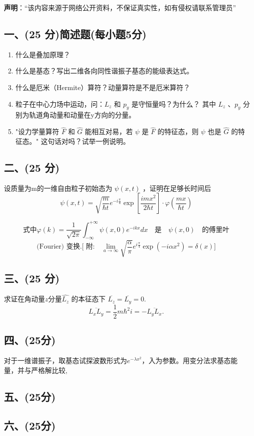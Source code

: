 
\textbf{声明}：“该内容来源于网络公开资料，不保证真实性，如有侵权请联系管理员”

\subsection{一、(25 分)简述题(每小题5分)}
\begin{enumerate}
        \item 什么是叠加原理？
        \item 什么是基态？写出二维各向同性谐振子基态的能级表达式。
        \item 什么是厄米（Hermite）算符？动量算符是不是厄米算符？
        \item 粒子在中心力场中运动，问：$L_z$ 和 $p_y$ 是守恒量吗？为什么？
        其中 $L_z$ 、$p_y$ 分别为轨道角动量和动量在y方向的分量。
        \item "设力学量算符 $\hat{F}$ 和 $\hat{G}$ 能相互对易，若 $\psi$ 是 $\hat{F}$ 的特征态，则 $\psi$ 也是 $\hat{G}$ 的特征态。" 这句话对吗？试举一例说明。
    \end{enumerate}
\subsection{二、(25 分)}
设质量为m的一维自由粒子初始态为 $\psi(x,t)$ ，证明在足够长时间后
$$\psi(x,t) = \sqrt{\frac{m}{\hbar t}} e^{-i\frac{\pi}{4}} \exp \left[ \frac{imx^2}{2\hbar t} \right] \cdot \varphi \left( \frac{mx}{\hbar t} \right)~$$

$$\text{式中}\varphi(k) = \frac{1}{\sqrt{2\pi}} \int_{-\infty}^{+\infty} \psi(x, 0) e^{-ikx} dx \quad \text{是} \quad \psi(x, 0) \quad \text{的傅里叶}~$$
$$\text{(Fourier) 变换.[ 附:} \quad \lim_{a \to \infty} \sqrt{\frac{\alpha}{\pi}} e^{i \frac{\pi}{4}} \exp(-i \alpha x^2) = \delta(x)]~$$
\subsection{三、(25 分)}
求证在角动量$z$分量$\hat{L_z}$ 的本征态下 $\overline{L_z} = \overline{L_y} = 0.$
$$\overline{L_x L_y} = \frac{1}{2} m \hbar^2 i = - \overline{L_y L_x}.~$$
\subsection{四、(25分)}
对于一维谱振子，取基态试探波数形式为$e^{-\lambda x^2}$，入为参数。用变分法求基态能量，并与严格解比较,
\subsection{五、(25分)}

\subsection{六、(25分)}